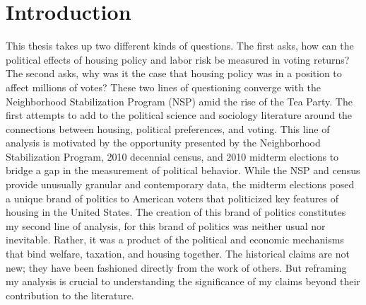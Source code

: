 \documentclass[12pt,oneside]{psthesis}
\begin{document}
\mainmatter %
\pagestyle{fancyplain} %
\doublespacing
\titleformat{\chapter}[display]{\normalfont\huge\bfseries\singlespacing}{\chaptertitlename\ \thechapter}{40pt}{\huge}
\titleformat{\section}{\singlespacing\normalfont\Large\bfseries}{\thesection}{1em}{}
\titleformat{\subsection}{\singlespacing\normalfont\large\bfseries}{\thesubsection}{1em}{}
\titleformat{\subsubsection}{\singlespacing\normalfont\normalsize\bfseries}{\thesubsubsection}{1em}{}

\hypertarget{actors-motive}{%
\chapter{Introduction}\label{actors-motive}}

This thesis takes up two different kinds of questions.
The first asks, how can the political effects of housing policy and labor risk be measured in voting returns?
The second asks, why was it the case that housing policy was in a position to affect millions of votes?
These two lines of questioning converge with the Neighborhood Stabilization Program (NSP) amid the rise of the Tea Party.
The first attempts to add to the political science and sociology literature around the connections between housing, political preferences, and voting.
This line of analysis is motivated by the opportunity presented by the Neighborhood Stabilization Program, 2010 decennial census, and 2010 midterm elections to bridge a gap in the measurement of political behavior.
While the NSP and census provide unusually granular and contemporary data, the midterm elections posed a unique brand of politics to American voters that politicized key features of housing in the United States.
The creation of this brand of politics constitutes my second line of analysis, for this brand of politics was neither usual nor inevitable.
Rather, it was a product of the political and economic mechanisms that bind welfare, taxation, and housing together.
The historical claims are not new; they have been fashioned directly from the work of others.
But reframing my analysis is crucial to understanding the significance of my claims beyond their contribution to the literature.
\end{document}
